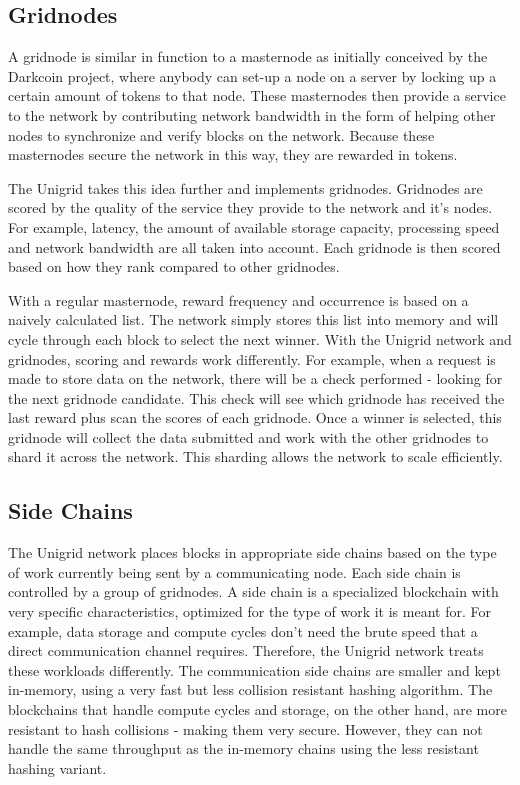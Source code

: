 \documentclass{article}
\begin{document}
\subsection{Gridnodes}
A gridnode is similar in function to a masternode as initially conceived by the Darkcoin project, where anybody can set-up a node on a server by locking up a certain amount of tokens to that node. These masternodes then provide a service to the network by contributing network bandwidth in the form of helping other nodes to synchronize and verify blocks on the network. Because these masternodes secure the network in this way, they are rewarded in tokens.

The Unigrid takes this idea further and implements gridnodes. Gridnodes are scored by the quality of the service they provide to the network and it's nodes. For example, latency, the amount of available storage capacity, processing speed and network bandwidth are all taken into account. Each gridnode is then scored based on how they rank compared to other gridnodes.

With a regular masternode, reward frequency and occurrence is based on a naively calculated list. The network simply stores this list into memory and will cycle through each block to select the next winner. With the Unigrid network and gridnodes, scoring and rewards work differently. For example, when a request is made to store data on the network, there will be a check performed - looking for the next gridnode candidate. This check will see which gridnode has received the last reward plus scan the scores of each gridnode. Once a winner is selected, this gridnode will collect the data submitted and work with the other gridnodes to shard it across the network. This sharding allows the network to scale efficiently.

\subsection{Side Chains}
The Unigrid network places blocks in appropriate side chains based on the type of work currently being sent by a communicating node. Each side chain is controlled by a group of gridnodes. A side chain is a specialized blockchain with very specific characteristics, optimized for the type of work it is meant for. For example, data storage and compute cycles don't need the brute speed that a direct communication channel requires. Therefore, the Unigrid network treats these workloads differently. The communication side chains are smaller and kept in-memory, using a very fast but less collision resistant hashing algorithm. The blockchains that handle compute cycles and storage, on the other hand, are more resistant to hash collisions - making them very secure. However, they can not handle the same throughput as the in-memory chains using the less resistant hashing variant.
\end{document}
